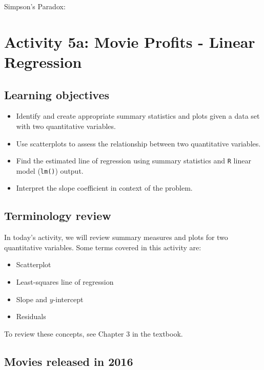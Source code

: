 \documentclass[
]{report}
\begin{document}
Simpson's Paradox:

\newpage

\hypertarget{activity-5a-movie-profits---linear-regression}{%
\section{Activity 5a: Movie Profits - Linear Regression}\label{activity-5a-movie-profits---linear-regression}}


\hypertarget{learning-objectives-3}{%
\subsection{Learning objectives}\label{learning-objectives-3}}

\begin{itemize}
\item
  Identify and create appropriate summary statistics and plots
  given a data set with two quantitative variables.
\item
  Use scatterplots to assess the relationship between two quantitative variables.
\item
  Find the estimated line of regression using summary statistics and \texttt{R} linear model (\texttt{lm()}) output.
\item
  Interpret the slope coefficient in context of the problem.
\end{itemize}

\hypertarget{terminology-review-8}{%
\subsection{Terminology review}\label{terminology-review-8}}

In today's activity, we will review summary measures and plots for two quantitative variables. Some terms covered in this activity are:

\begin{itemize}
\item
  Scatterplot
\item
  Least-squares line of regression
\item
  Slope and \(y\)-intercept
\item
  Residuals
\end{itemize}

To review these concepts, see Chapter 3 in the textbook.

\hypertarget{movies-released-in-2016-2}{%
\subsection{Movies released in 2016}\label{movies-released-in-2016-2}}
\end{document}
